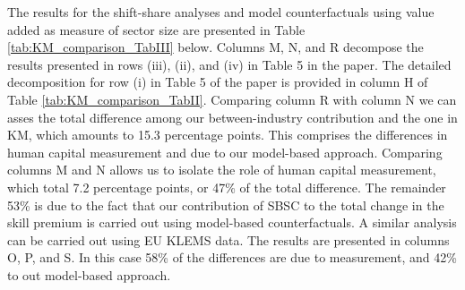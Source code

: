\documentclass[10pt]{article}
\begin{document}
The results for the shift-share analyses and model counterfactuals using value added as measure of sector size are presented in Table \ref{tab:KM_comparison_TabIII} below. Columns M, N, and R decompose the results presented in rows (iii), (ii), and (iv) in Table 5 in the paper. The detailed decomposition for row (i) in Table 5 of the paper is provided in column H of Table \ref{tab:KM_comparison_TabII}. Comparing column R with column N we can asses the total difference among our between-industry contribution and the one in KM, which amounts to 15.3 percentage points. This comprises the differences in human capital measurement and due to our model-based approach. Comparing columns M and N allows us to isolate the role of human capital measurement, which total 7.2 percentage points, or 47\% of the total difference. The remainder 53\% is due to the fact that our contribution of SBSC to the total change in the skill premium is carried out using model-based counterfactuals. A similar analysis can be carried out using EU KLEMS data. The results are presented in columns O, P, and S. In this case 58\% of the differences are due to measurement, and 42\% to out model-based approach.
\end{document}

